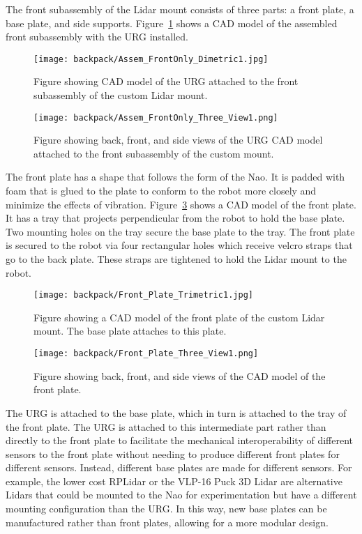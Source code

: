 The front subassembly of the Lidar mount consists of three parts: a front plate,
a base plate, and side supports. Figure~\ref{fig:nao_lidar_mount_dimetric1}
shows a CAD model of the assembled front subassembly with the URG installed.

\begin{figure}
\centering
\texttt{[image: backpack/Assem\_FrontOnly\_Dimetric1.jpg]}
\caption{Figure showing CAD model of the URG attached to the front subassembly
         of the custom Lidar mount.}
\label{fig:nao_lidar_mount_dimetric1}
\end{figure}

\begin{figure}
\centering
\texttt{[image: backpack/Assem\_FrontOnly\_Three\_View1.png]}
\caption{Figure showing back, front, and side views of the URG CAD model
         attached to the front subassembly of the custom mount.}
\label{fig:nao_lidar_mount_three_view1}
\end{figure}

The front plate has a shape that follows the form of the Nao.
It is padded with foam that is glued to the plate to conform to the robot more
closely and minimize the effects of vibration.
Figure~\ref{fig:nao_lidar_mount_frontplate_trimetric1} shows a CAD model of the
front plate. It has a tray that projects perpendicular from the robot to hold 
the base plate. Two mounting holes on the tray secure the base plate to the tray.
The front plate is secured to the robot via four rectangular holes which receive
velcro straps that go to the back plate. These straps are tightened to hold the
Lidar mount to the robot.

\begin{figure}
\centering
\texttt{[image: backpack/Front\_Plate\_Trimetric1.jpg]}
\caption{Figure showing a CAD model of the front plate of the custom Lidar
         mount. The base plate attaches to this plate.}
\label{fig:nao_lidar_mount_frontplate_trimetric1}
\end{figure}

\begin{figure}
\centering
\texttt{[image: backpack/Front\_Plate\_Three\_View1.png]}
\caption{Figure showing back, front, and side views of the CAD model of the
         front plate.}
\label{fig:nao_lidar_mount_frontplate_three_view1}
\end{figure}

The URG is attached to the base plate, which in turn is attached to the 
tray of the front plate. The URG is attached to this intermediate part
rather than directly to the front plate to facilitate the mechanical
interoperability of different sensors to the front plate without needing
to produce different front plates for different sensors. Instead, different
base plates are made for different sensors. For example, the lower cost
RPLidar \cite{rp_lidar} or the VLP-16 Puck 3D Lidar
\cite{puck_lidar} are alternative Lidars that could
be mounted to the Nao for experimentation but have a different mounting 
configuration than the URG\@. In this way, new base plates can be manufactured
rather than front plates, allowing for a more modular design.

